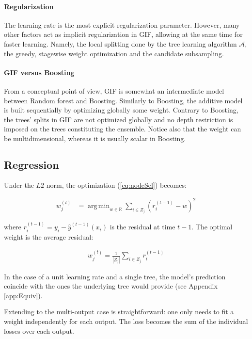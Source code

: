 \documentclass{article}
\DeclareMathOperator*{\argmin}{arg\,min}
\begin{document}
\paragraph{Regularization}
The learning rate is the most explicit regularization parameter. However, many 
other factors act as implicit regularization in GIF, allowing at the same time 
for faster learning. 
Namely, the local splitting done by the tree learning algorithm $\mathcal{A}$, 
the greedy, stagewise weight optimization and the candidate subsampling.


\paragraph{GIF versus Boosting}
From a conceptual point of view, GIF is somewhat an intermediate model 
between Random forest and Boosting. Similarly to Boosting, the additive model 
is  built sequentially by optimizing globally some weight. Contrary to 
Boosting, the trees' splits in GIF are not optimized globally and no depth 
restriction is imposed on the trees constituting the ensemble. Notice also that 
the weight can be multidimensional, whereas it is usually scalar in Boosting.


\subsection{Regression}
\label{subsec:regression}

Under the $L2$-norm, the optimization (\ref{eq:nodeSel}) becomes:

\begin{align}\label{eq:L2min}
w_j^{(t)} &=  \argmin_{w \in \mathbb{R}} \sum_{i \in Z_j} \left(r_i^{(t-1)} - 
w\right)^2
\end{align}

where $r_i^{(t-1)} = y_i - \hat{y}^{(t-1)}(x_i)$ is the residual at time $t-1$.
The optimal weight is the average residual:

\begin{align}\label{eq:L2Solution}
w_j^{(t)} = \frac{1}{|Z_j|} \sum_{i \in Z_j} r_i^{(t-1)}
\end{align}

In the case of a unit learning rate and a single tree, the model's prediction 
coincide with the ones the underlying tree would provide (see Appendix 
\ref{app:Equiv}).

Extending to the multi-output case is straightforward: one only needs to fit a 
weight independently for each output. The loss becomes the sum of the 
individual losses over each output.
\end{document}
